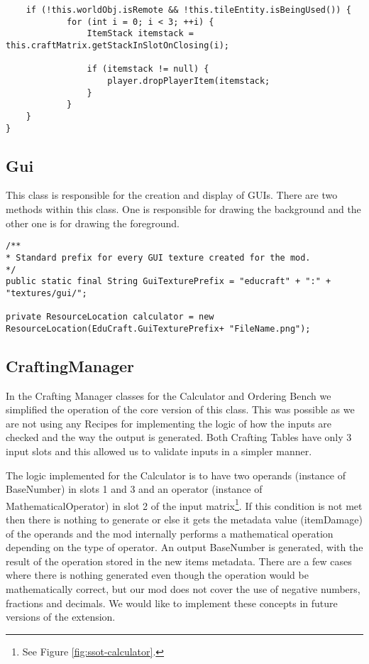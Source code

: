 \begin{itemize}
\begin{lstlisting}
	if (!this.worldObj.isRemote && !this.tileEntity.isBeingUsed()) {
			for (int i = 0; i < 3; ++i) {
				ItemStack itemstack = this.craftMatrix.getStackInSlotOnClosing(i);

				if (itemstack != null) {
					player.dropPlayerItem(itemstack;
				}
			}
	}
}
\end{lstlisting}
\end{itemize}

\subsection{Gui}
This class is responsible for the creation and display of GUIs.
There are two methods within this class. One is responsible for drawing the background and the other one is for drawing the foreground.

\begin{lstlisting}
/**
* Standard prefix for every GUI texture created for the mod.
*/
public static final String GuiTexturePrefix = "educraft" + ":" + "textures/gui/";

private ResourceLocation calculator = new ResourceLocation(EduCraft.GuiTexturePrefix+ "FileName.png");
\end{lstlisting}

\subsection{CraftingManager}
In the Crafting Manager classes for the Calculator and Ordering Bench we simplified the operation of the core version of this class. This was possible as we are not using any Recipes for implementing the logic of how the inputs are checked and the way the output is generated. Both Crafting Tables have only 3 input slots and this allowed us to validate inputs in a simpler manner.

The logic implemented for the Calculator is to have two operands (instance of BaseNumber) in slots 1 and 3 and an operator (instance of MathematicalOperator) in slot 2 of the input matrix\footnote{See Figure \ref{fig:ssot-calculator}.}.
If this condition is not met then there is nothing to generate or else it gets the metadata value (itemDamage) of the operands and the mod internally performs a mathematical operation depending on the type of operator. An output BaseNumber is generated, with the result of the operation stored in the new items metadata. There are a few cases where there is nothing generated even though the operation would be mathematically correct, but our mod does not cover the use of negative numbers, fractions and decimals. We would like to implement these concepts in future versions of the extension.

